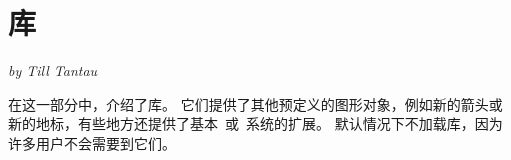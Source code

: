 \part{库}
\label{part-libraries}

{\Large \emph{by Till Tantau}}


\bigskip
\noindent
在这一部分中，介绍了库。 它们提供了其他预定义的图形对象，例如新的箭头或新的地标，有些地方还提供了基本\pgfname\ 或\tikzname\ 系统的扩展。 默认情况下不加载库，因为许多用户不会需要到它们。

\medskip
\noindent
